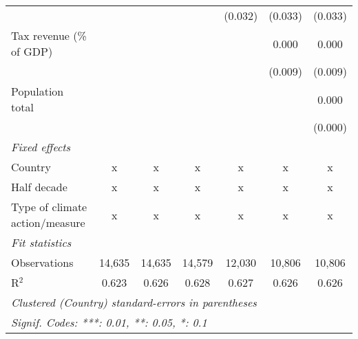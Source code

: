 \begin{tabular}{lcccccc}
                                                                &         &               &               & (0.032)       & (0.033)      & (0.033)\\   
   Tax revenue (\% of GDP)                                      &         &               &               &               & 0.000        & 0.000\\   
                                                                &         &               &               &               & (0.009)      & (0.009)\\   
   Population total                                             &         &               &               &               &              & 0.000\\   
                                                                &         &               &               &               &              & (0.000)\\   
   \emph{Fixed effects}\\
   Country                                                      & x       & x             & x             & x             & x            & x\\  
   Half decade                                                  & x       & x             & x             & x             & x            & x\\  
   Type of climate action/measure                               & x       & x             & x             & x             & x            & x\\  
   \midrule \emph{Fit statistics}\\
   Observations                                                 & 14,635  & 14,635        & 14,579        & 12,030        & 10,806       & 10,806\\  
   R$^2$                                                        & 0.623   & 0.626         & 0.628         & 0.627         & 0.626        & 0.626\\  
   \midrule
   \multicolumn{7}{l}{\emph{Clustered (Country) standard-errors in parentheses}}\\
   \multicolumn{7}{l}{\emph{Signif. Codes: ***: 0.01, **: 0.05, *: 0.1}}\\
\end{tabular}
\par\endgroup


